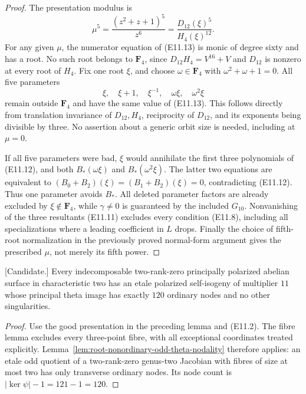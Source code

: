 \begin{proof}
The presentation modulus is
\[
 \mu^5=\frac{(z^2+z+1)^5}{z^6}
       =\frac{D_{12}(\xi)^5}{H_4(\xi)^{12}}.                  \tag{E11.13}
\]
For any given $\mu$, the numerator equation of (E11.13) is monic of
degree sixty and has a root. No such root belongs to $\mathbf F_4$,
since $D_{12}H_4=V^{16}+V$ and $D_{12}$ is nonzero at every root
of $H_4$. Fix one root $\xi$, and choose
$\omega\in\mathbf F_4$ with $\omega^2+\omega+1=0$.
All five parameters
\[
             \xi,\quad \xi+1,\quad \xi^{-1},
                    \quad \omega\xi,\quad \omega^2\xi
\]
remain outside $\mathbf F_4$ and have the same value of (E11.13).
This follows directly from translation invariance of $D_{12},H_4$,
reciprocity of $D_{12}$, and its exponents being divisible by three.
No assertion about a generic orbit size is needed, including at
$\mu=0$.

If all five parameters were bad, $\xi$ would annihilate the first
three polynomials of (E11.12), and both $B_*(\omega\xi)$ and
$B_*(\omega^2\xi)$. The latter two equations are equivalent to
$(B_0+B_2)(\xi)=(B_1+B_2)(\xi)=0$, contradicting (E11.12).
Thus one parameter avoids $B_*$. All deleted parameter factors are
already excluded by $\xi\notin\mathbf F_4$, while $\gamma\ne0$
is guaranteed by the included $G_{10}$. Nonvanishing of the three
resultants (E11.11) excludes every condition (E11.8), including all
specializations where a leading coefficient in $L$ drops.
Finally the choice of fifth-root normalization in the previously
proved normal-form argument gives the prescribed $\mu$, not merely
its fifth power.
\end{proof}

\begin{theorem}
\label{thm:uniform-eleven-nodal-self-isogeny-candidate}
\textup{[Candidate.]}
Every indecomposable two-rank-zero principally polarized abelian surface
in characteristic two has an etale polarized self-isogeny of multiplier
$11$ whose principal theta image has exactly $120$ ordinary nodes and
no other singularities.
\end{theorem}
\begin{proof}
Use the good presentation in the preceding lemma and (E11.2).
The fibre lemma excludes every three-point fibre, with all exceptional
coordinates treated explicitly. Lemma~\ref{lem:root-nonordinary-odd-theta-nodality}
therefore applies: an etale odd quotient of a two-rank-zero genus-two
Jacobian with fibres of size at most two has only transverse ordinary
nodes. Its node count is $|\ker\psi|-1=121-1=120$.
\end{proof}

